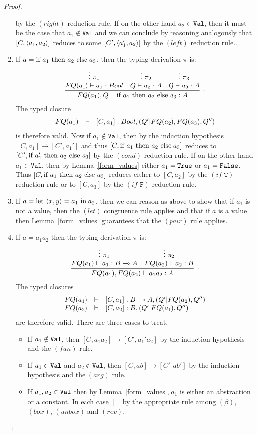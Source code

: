 \documentclass{article}
\begin{document}
\begin{proof}
\begin{enumerate}
  by the $(right)$ reduction rule.
  If on the other hand $a_2\in\mathtt{Val}$, then it must be the case that $a_1\notin\mathtt{Val}$ 
  and we can conclude by reasoning analogously that $[C,\langle a_1,a_2\rangle]$ reduces to 
  some $[C',\langle a_1',a_2\rangle]$ by the $(left)$ reduction rule.. 
  \item If $a=\text{if}~ a_1 ~\text{then}~ a_2 ~\text{else}~ a_3$, then the typing derivation $\pi$ is:
  \[
  \infer[.]{FQ(a_1),Q\entails \ifthenelse{a_1}{a_2}{a_3}:A}{
    \deduce[]{FQ(a_1)\entails a_1:Bool }{
      \vdots~\pi_1
    }
    &
    \deduce[]{Q \entails a_2:A}{
      \vdots~\pi_2
    }    
    &
    \deduce[]{Q \entails a_3:A}{
      \vdots~\pi_3
    }    
  }
  \]  
  The typed closure
  \[
  \begin{array}{rcl}
  FQ(a_1) & \vdash & [C,a_1]:Bool,(Q'|FQ(a_2),FQ(a_3),Q'')
  \end{array}
  \]
  is therefore valid. Now if $a_1\notin\mathtt{Val}$, then by the induction hypothesis 
  $[C,a_1]\to[C',a_1']$ and thus $[C,\text{if}~ a_1 ~\text{then}~ a_2 ~\text{else}~ a_3]$ reduces 
  to $[C',\text{if}~ a_1' ~\text{then}~ a_2 ~\text{else}~ a_3]$ by the $(cond)$ reduction rule. 
  If on the other hand $a_1\in\mathtt{Val}$, then by 
  Lemma~\hyperref[form_values]{\ref*{form_values}} either $a_1=\texttt{True}$ or $a_1=\texttt{False}$. 
  Thus $[C,\text{if}~ a_1 ~\text{then}~ a_2 ~\text{else}~ a_3]$ reduces either to $[C,a_2]$ by the 
  $(if\mbox{-}\mathtt{T})$ reduction rule or 
  to $[C,a_3]$ by the $(if\mbox{-}\mathtt{F})$ reduction rule.
  \item If $a=\text{let}~ \langle x,y\rangle = a_1 ~\text{in}~ a_2$, then we can reason as above to show that 
  if $a_1$ is not a value, then the $(let)$ congruence rule applies and that if 
  $a$ is a value then Lemma~\hyperref[form_values]{\ref*{form_values}} 
  guarantees that the $(pair)$ rule applies.
  \item If $a=a_1a_2$ then the typing derivation $\pi$ is: 
  \[
    \infer[.]{FQ(a_1),FQ(a_2)\entails a_1a_2:A}{
      \deduce[]{FQ(a_1)\entails a_1:B\loli A}{
        \vdots~\pi_1
      }
      &
      \deduce[]{FQ(a_2)\entails a_2:B}{
        \vdots~\pi_2
      }      
    }
  \]  
  The typed closures
  \[
  \begin{array}{rcl}
  FQ(a_1) & \vdash & [C,a_1]:B\multimap A,(Q'|FQ(a_2),Q'')\\
  FQ(a_2) & \vdash & [C,a_2]:B, (Q'|FQ(a_1),Q'')
  \end{array}
  \]
  are therefore valid. There are three cases to treat.
  \begin{itemize}
    \item If $a_1\notin\texttt{Val}$, then $[C,a_1a_2]\to[C',a_1'a_2]$
    by the induction hypothesis and the $(fun)$ rule.
    \item If $a_1\in\texttt{Val}$ and $a_2\notin\mathtt{Val}$, then 
    $[C,ab]\to[C',ab']$ by the induction hypothesis and the $(arg)$ 
    rule.
    \item If $a_1,a_2\in\texttt{Val}$ then by 
    Lemma~\hyperref[form_values]{\ref*{form_values}}, $a_1$ is either 
    an abstraction or a constant. In each case $[]$ by the appropriate 
    rule among $(\beta)$, $(box)$, $(unbox)$ and $(rev)$. 
  \end{itemize}
\end{enumerate}
\end{proof}
\end{document}
